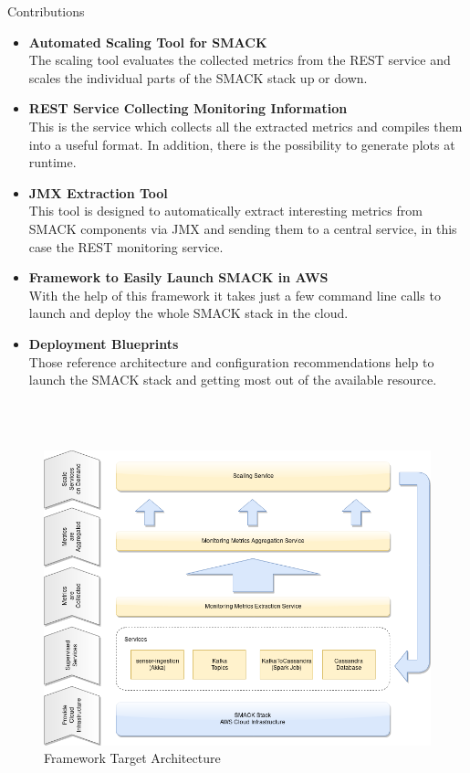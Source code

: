 \documentclass[final,hyperref={pdfpagelabels=true}]{beamer}
\begin{document}
\begin{frame}
\begin{columns}[t]
\begin{column}{.48\textwidth}
\begin{block}{Contributions}
	\begin{itemize}
  	  \item \textbf{Automated Scaling Tool for SMACK}\\
          The scaling tool evaluates the collected metrics from the REST service and scales the individual parts of the SMACK stack up or down.
   	 \item \textbf{REST Service Collecting Monitoring Information}\\
          This is the service which collects all the extracted metrics and compiles them into a useful format.
          In addition, there is the possibility to generate plots at runtime.
  	  \item \textbf{JMX Extraction Tool}\\
          This tool is designed to automatically extract interesting metrics from SMACK components via JMX and sending them to a central service, in this case the REST monitoring service.
   	 \item \textbf{Framework to Easily Launch SMACK in AWS}\\
          With the help of this framework it takes just a few command line calls to launch and deploy the whole SMACK stack in the cloud.
   	 \item \textbf{Deployment Blueprints}\\
          Those reference architecture and configuration recommendations help to launch the SMACK stack and getting most out of the available resource.
	\end{itemize}
		\hfill \\ \hfill \\

	\begin{figure}[!htbp]
  		\centering
 		 \includegraphics[keepaspectratio=true,scale=1.3]{figures/architecture}
  		  \caption{Framework Target Architecture}
  		  \label{fig:architecture}
	\end{figure}
      \end{block}



\end{column}
\end{columns}
\end{frame}
\end{document}
